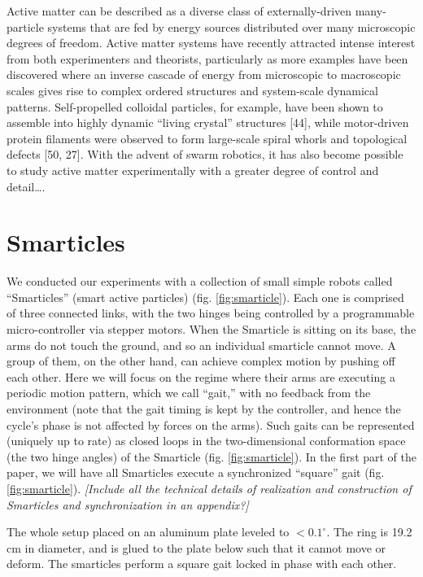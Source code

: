 \documentclass[reprint,prx]{revtex4-1}
\renewcommand{\=}[1]{\stackrel{#1}{=}} %
\renewcommand{\deg}{^{\circ}} %
\renewcommand{\(}{\left (}
\renewcommand{\)}{\right  )}
\renewcommand{\[}{\left [}
\renewcommand{\]}{\right ]}
\newcommand{\<}{\left <}
\renewcommand{\>}{\right >}
\theoremstyle{definition}
\theoremstyle{remark}
\renewcommand{\todo}[1]{\textit{\color{red}[#1]}}
\begin{document}
Active matter can be described as a diverse class of externally-driven many-particle systems that are fed by energy sources distributed over many microscopic degrees of freedom. Active matter systems have recently attracted intense interest from both experimenters and theorists, particularly as more examples have been discovered where an inverse cascade of energy from microscopic to macroscopic scales gives rise to complex ordered structures and system-scale dynamical patterns. Self-propelled colloidal particles, for example, have been shown to assemble into highly dynamic “living crystal” structures [44], while motor-driven protein filaments were observed to form large-scale spiral whorls and topological defects [50, 27]. With the advent of swarm robotics, it has also become possible to study active matter experimentally with a greater degree of control and detail….


\section{Smarticles}
We conducted our experiments with a collection of small simple robots called ``Smarticles'' (smart active particles) (fig. \ref{fig:smarticle}). Each one is comprised of three connected links, with the two hinges being controlled by a programmable micro-controller via stepper motors. When the Smarticle is sitting on its base, the arms do not touch the ground, and so an individual smarticle cannot move. A group of them, on the other hand, can achieve complex motion by pushing off each other. Here we will focus on the regime where their arms are executing a periodic motion pattern, which we call ``gait,'' with no feedback from the environment (note that the gait timing is kept by the controller, and hence the cycle's phase is not affected by forces on the arms). Such gaits can be represented (uniquely up to rate) as closed loops in the two-dimensional conformation space (the two hinge angles) of the Smarticle (fig. \ref{fig:smarticle}). In the first part of the paper, we will have all Smarticles execute a synchronized ``square'' gait (fig. \ref{fig:smarticle}). \todo{Include all the technical details of realization and construction of Smarticles and synchronization in an appendix?}

The whole setup placed on an aluminum plate leveled to $ < 0.1\deg $. The ring is 19.2 cm in diameter, and is glued to the plate below such that it cannot move or deform. The smarticles perform a square gait locked in phase with each other.
\end{document}
